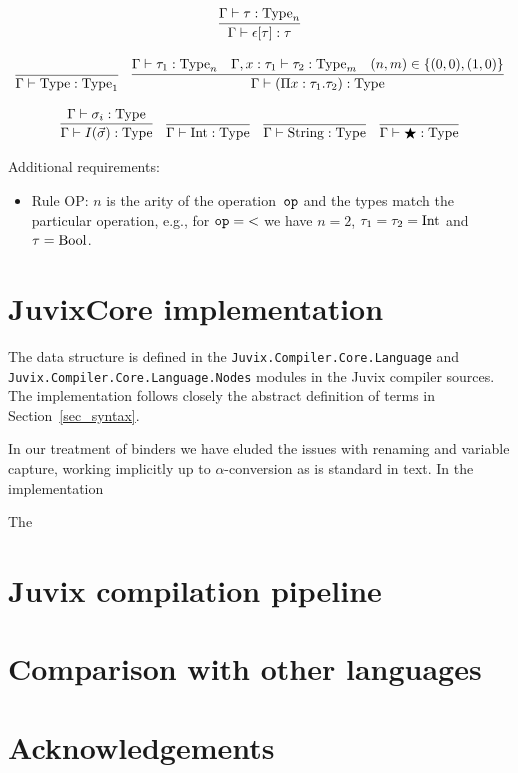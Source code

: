 \documentclass[final]{msc}
\begin{document}
\[\begin{array}{c}
\\ \\
\infer{\Gamma \proves \epsilon[\tau] : \tau}{\Gamma \proves \tau : \Type_n}
\\ \\
\infer{\Gamma \proves \Type : \Type_1}{}\quad
\infer{\Gamma \proves (\Pi x : \tau_1 . \tau_2) : \Type}{\Gamma \proves \tau_1 : \Type_n & \Gamma, x : \tau_1 \proves \tau_2 : \Type_m & (n,m) \in \{(0,0), (1,0)\}}
\\ \\
\infer{\Gamma \proves I(\vec{\sigma}) : \Type}{\Gamma \proves \sigma_i : \Type}\quad
\infer{\Gamma \proves \Int : \Type}{}\quad
\infer{\Gamma \proves \String : \Type}{}\quad
\infer{\Gamma \proves \Dynamic : \Type}{}
\end{array}
\]

Additional requirements:
\begin{itemize}
\item Rule OP: $n$ is the arity of the operation~$\mathtt{op}$ and the types match the particular operation, e.g., for $\mathtt{op} = {<}$ we have $n=2$, $\tau_1=\tau_2=\mathrm{Int}$ and $\tau=\mathrm{Bool}$.
\end{itemize}

\section{JuvixCore implementation}\label{sec_core_implementation}

The \JuvixCore{} data structure is defined in the \texttt{Juvix.Compiler.Core.Language} and \texttt{Juvix.Compiler.Core.Language.Nodes} modules in the Juvix compiler sources. The implementation follows closely the abstract definition of terms in Section~\ref{sec_syntax}.

In our treatment of binders we have eluded the issues with renaming and variable capture, working implicitly up to $\alpha$-conversion as is standard in text. In the implementation

The \JuvixCore{}

\section{Juvix compilation pipeline}\label{sec_pipeline}

\section{Comparison with other languages}\label{sec_comparison}



\section*{Acknowledgements}
\nocite{*}

\end{document}
